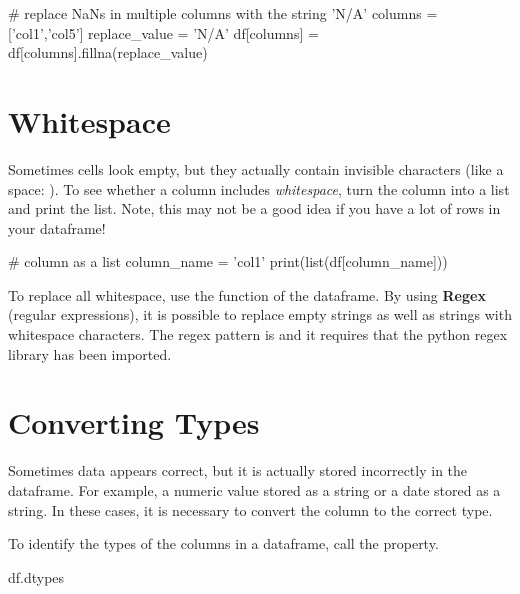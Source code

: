 \begin{pycode}
    # replace NaNs in multiple columns with the string 'N/A'
    columns = ['col1','col5']
    replace_value = 'N/A'
    df[columns] = df[columns].fillna(replace_value)
\end{pycode}



\section{Whitespace}

Sometimes cells look empty, but they actually contain invisible characters (like a space: ). To see whether a column includes \textit{whitespace}, turn the column into a list and print the list. Note, this may not be a good idea if you have a lot of rows in your dataframe!

\begin{pycode}
    # column as a list
    column_name = 'col1'
    print(list(df[column_name]))
\end{pycode}

To replace all whitespace, use the  function of the dataframe. By using \textbf{Regex} (regular expressions), it is possible to replace empty strings as well as strings with whitespace characters. The regex pattern is  and it requires that the python regex library has been imported.



\section{Converting Types}

Sometimes data appears correct, but it is actually stored incorrectly in the dataframe. For example, a numeric value stored as a string or a date stored as a string. In these cases, it is necessary to convert the column to the correct type.

To identify the types of the columns in a dataframe, call the  property.

\begin{pycode}
    df.dtypes
\end{pycode}


